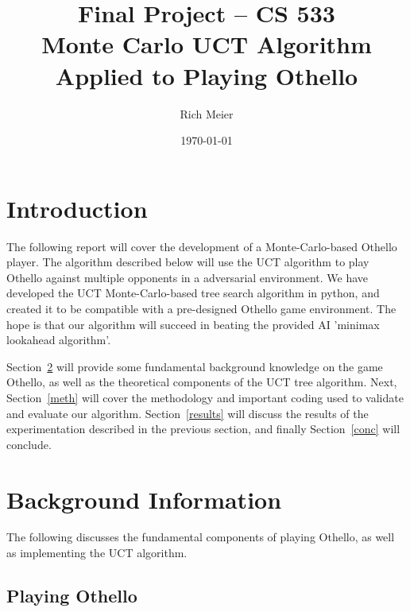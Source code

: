\documentclass[12pt,letterpaper]{article}
\begin{document}
\title{\vspace{-1in}Final Project -- CS 533 \\ Monte Carlo UCT Algorithm Applied to Playing Othello}
\author{Rich Meier}
\date{\today}
\maketitle

\vspace{-.5in}
\section{Introduction}
The following report will cover the development of a Monte-Carlo-based Othello player. The algorithm described below will use the UCT algorithm to play Othello against multiple opponents in a adversarial environment. We have developed the UCT Monte-Carlo-based tree search algorithm in python, and created it to be compatible with a pre-designed Othello game environment. The hope is that our algorithm will succeed in beating the provided AI 'minimax lookahead algorithm'.

Section~\ref{back} will provide some fundamental background knowledge on the game Othello, as well as the theoretical components of the UCT tree algorithm.  Next, Section~\ref{meth} will cover the methodology and important coding used to validate and evaluate our algorithm. Section~\ref{results} will discuss the results of the experimentation described in the previous section, and finally Section~\ref{conc} will conclude.

\section{Background Information}
\label{back}

The following discusses the fundamental components of playing Othello, as well as implementing the UCT algorithm.

\subsection{Playing Othello}
\end{document}
